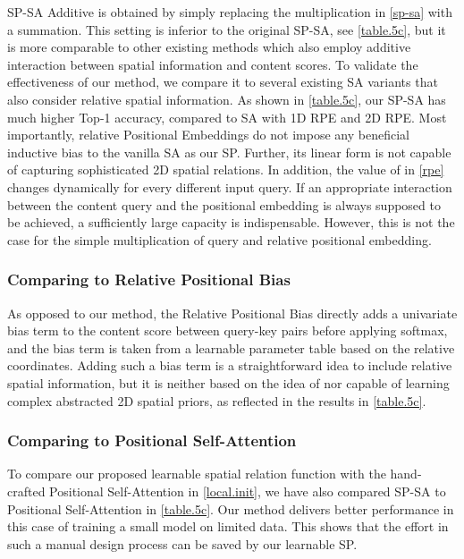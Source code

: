 \documentclass[authorversion, sigconf, acmthm=false, nonacm=true]{acmart}
\begin{document}
SP-SA Additive is obtained by simply replacing the multiplication in \cref{sp-sa} with a summation. 
This setting is inferior to the original SP-SA, see \cref{table.5c}, but it is more comparable to other existing methods which also 
employ additive interaction between spatial information and content scores. 
To validate the effectiveness of our method, we compare it to several existing SA variants that also consider relative spatial information. 
As shown in \cref{table.5c}, our SP-SA has much higher Top-1 accuracy, compared to SA with 1D RPE and 2D RPE. 
Most importantly, relative Positional Embeddings do not impose any beneficial inductive bias to the vanilla SA as our SP. Further, its linear form is not capable of 
capturing sophisticated 2D spatial relations.
In addition, the value of  in \cref{rpe} changes dynamically for every different input query.
If an appropriate interaction between the content query and the positional embedding is always supposed to be achieved, a sufficiently large capacity is indispensable. 
However, this is not the case for the simple 
multiplication of query and relative positional embedding.

\subsubsection{Comparing to Relative Positional Bias}
As opposed to our method, the Relative Positional Bias \cite{liu2021swin} directly adds a univariate bias term to the content score between query-key pairs before applying softmax, 
and the bias term is taken from a learnable parameter table based on the relative coordinates.
Adding such a bias term is a straightforward idea to include relative spatial information, 
but it is neither based on the idea of nor capable of learning complex abstracted 2D spatial priors,  
as reflected in the results in \cref{table.5c}.     

\subsubsection{Comparing to Positional Self-Attention}
To compare our proposed learnable spatial relation function with the hand-crafted Positional Self-Attention \cite{d'ascoli2021convit} in \cref{local.init},
we have also compared SP-SA to Positional Self-Attention in \cref{table.5c}. Our method delivers better performance in this case of training a small model on limited data.
This shows that the effort in such a manual design process can be saved by our learnable SP.
\end{document}
